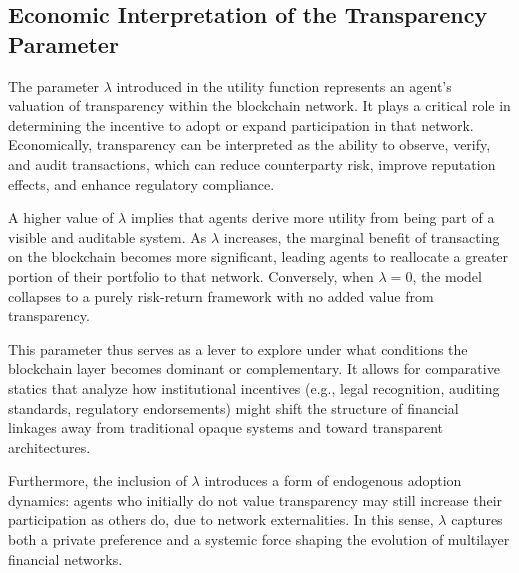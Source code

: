 \subsection{Economic Interpretation of the Transparency Parameter}

The parameter \( \lambda \) introduced in the utility function represents an agent's valuation of transparency within the blockchain network. It plays a critical role in determining the incentive to adopt or expand participation in that network. Economically, transparency can be interpreted as the ability to observe, verify, and audit transactions, which can reduce counterparty risk, improve reputation effects, and enhance regulatory compliance.

A higher value of \( \lambda \) implies that agents derive more utility from being part of a visible and auditable system. As \( \lambda \) increases, the marginal benefit of transacting on the blockchain becomes more significant, leading agents to reallocate a greater portion of their portfolio to that network. Conversely, when \( \lambda = 0 \), the model collapses to a purely risk-return framework with no added value from transparency.

This parameter thus serves as a lever to explore under what conditions the blockchain layer becomes dominant or complementary. It allows for comparative statics that analyze how institutional incentives (e.g., legal recognition, auditing standards, regulatory endorsements) might shift the structure of financial linkages away from traditional opaque systems and toward transparent architectures.

Furthermore, the inclusion of \( \lambda \) introduces a form of endogenous adoption dynamics: agents who initially do not value transparency may still increase their participation as others do, due to network externalities. In this sense, \( \lambda \) captures both a private preference and a systemic force shaping the evolution of multilayer financial networks.

